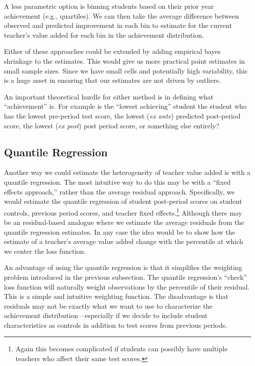 \documentclass[letterpaper,12pt]{article}
\begin{document}
A less parametric option is binning students based on their prior year achievement (e.g., quartiles). We can then take the average difference between observed and predicted improvement in each bin to estimate for the current teacher's value added for each bin in the achievement distribution.

Either of these approaches could be extended by adding empirical bayes shrinkage to the estimates. This would give us more practical point estimates in small sample sizes.  Since we have small cells and potentially high variability, this is a huge asset in ensuring that our estimates are not driven by outliers. 

An important theoretical hurdle for either  method is in defining what ``achievement'' is. For example is the ``lowest achieving'' student the student who has the lowest pre-period test score, the lowest (\textit{ex ante}) predicted post-period score, the lowest (\textit{ex post}) post period score,  or something else entirely? 


\subsection{Quantile Regression}
Another way we could estimate the heterogeneity of teacher value added is with a quantile regression. The most intuitive way to do this may be with a ``fixed effects approach,'' rather than the average residual approach. Specifically, we would estimate the quantile regression of student post-period scores on student controls, previous period scores, and teacher fixed effects.\footnote{Again this becomes complicated if students can possibly have multiple teachers who affect their same test scores.} Although there may be an residual-based analogue where we estimate the average residuals from the quantile regression estimates. In any case the idea would be to show how the estimate of a teacher's average value added change with the percentile at which we center the loss function. 

An advantage of using the quantile regression is that it simplifies the weighting problem introduced in the previous subsection. The quantile regression's ``check'' loss function will naturally weight observations by the percentile of their residual. This is a simple and intuitive weighting function. The disadvantage is that residuals may not be exactly what we want to use to characterize the achievement distribution---especially if we decide to include student characteristics as controls in addition to test scores from previous periods.
\end{document}
